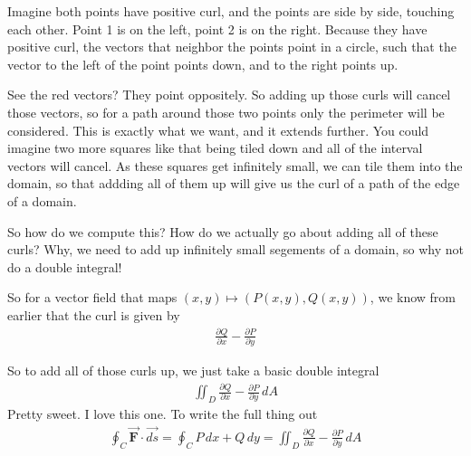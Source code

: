 \documentclass[12pt, letterpaper]{article}
\begin{document}
Imagine both points have positive curl, and the points are side by side, touching each other.
Point 1 is on the left, point 2 is on the right.
Because they have positive curl, the vectors that neighbor the points point in a circle, such that the vector to the left of the point points down, and to the right points up.
\begin{figure}[!h]
    \centering
\end{figure}

See the red vectors?
They point oppositely.
So adding up those curls will cancel those vectors, so for a path around those two points only the perimeter will be considered.
This is exactly what we want, and it extends further.
You could imagine two more squares like that being tiled down and all of the interval vectors will cancel.
As these squares get infinitely small, we can tile them into the domain, so that addding all of them up will give us the curl of a path of the edge of a domain.

So how do we compute this?
How do we actually go about adding all of these curls?
Why, we need to add up infinitely small segements of a domain, so why not do a double integral!

So for a vector field that maps $(x, y) \mapsto (P(x, y), Q(x, y))$, we know from earlier that the curl is given by
\begin{gather*}
    \frac{\partial Q}{\partial x} - \frac{\partial P}{\partial y}
\end{gather*}

So to add all of those curls up, we just take a basic double integral
\begin{gather*}
    \iint_D \frac{\partial Q}{\partial x} - \frac{\partial P}{\partial y}\, dA
\end{gather*}
Pretty sweet. I love this one.
To write the full thing out
\begin{gather*}
    \oint_C \vec{\textbf{F}} \cdot \vec{ds} = \oint_C P\,dx + Q\,dy = \iint_D \frac{\partial Q}{\partial x} - \frac{\partial P}{\partial y}\, dA
\end{gather*}
\end{document}
